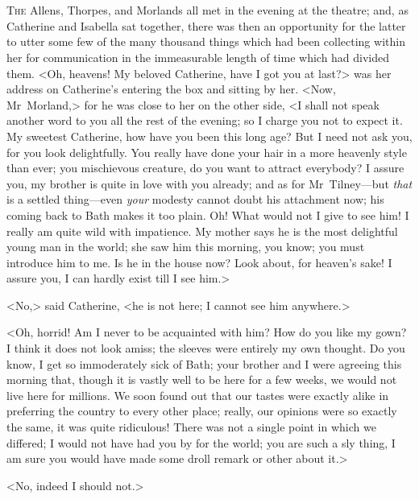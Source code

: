 \chapter[Chapter \thechapter]{} 

 \lettrine{T}{he} Allens, Thorpes, and Morlands all met in the evening at the theatre; and, as Catherine and Isabella sat together, there was then an opportunity for the latter to utter some few of the many thousand things which had been collecting within her for communication in the immeasurable length of time which had divided them. <Oh, heavens! My beloved Catherine, have I got you at last?> was her address on Catherine's entering the box and sitting by her. <Now, Mr~Morland,> for he was close to her on the other side, <I shall not speak another word to you all the rest of the evening; so I charge you not to expect it. My sweetest Catherine, how have you been this long age? But I need not ask you, for you look delightfully. You really have done your hair in a more heavenly style than ever; you mischievous creature, do you want to attract everybody? I assure you, my brother is quite in love with you already; and as for Mr~Tilney—but \textit{that} is a settled thing—even \textit{your} modesty cannot doubt his attachment now; his coming back to Bath makes it too plain. Oh! What would not I give to see him! I really am quite wild with impatience. My mother says he is the most delightful young man in the world; she saw him this morning, you know; you must introduce him to me. Is he in the house now? Look about, for heaven's sake! I assure you, I can hardly exist till I see him.> 

 <No,> said Catherine, <he is not here; I cannot see him anywhere.> 

 <Oh, horrid! Am I never to be acquainted with him? How do you like my gown? I think it does not look amiss; the sleeves were entirely my own thought. Do you know, I get so immoderately sick of Bath; your brother and I were agreeing this morning that, though it is vastly well to be here for a few weeks, we would not live here for millions. We soon found out that our tastes were exactly alike in preferring the country to every other place; really, our opinions were so exactly the same, it was quite ridiculous! There was not a single point in which we differed; I would not have had you by for the world; you are such a sly thing, I am sure you would have made some droll remark or other about it.> 

 <No, indeed I should not.> 

